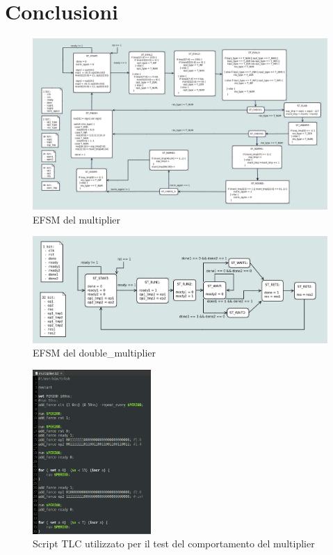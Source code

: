 \documentclass[]{IEEEtran}
\begin{document}
\section{Conclusioni}




\appendix

\begin{figure}[bt]
    \centering
    \includegraphics[width=\textwidth]{figures/EFSM-multiplier}
    \caption{EFSM del multiplier}
    \label{fig:EFSM_multiplier}
\end{figure}

\begin{figure}[bt]
    \centering
    \includegraphics[width=\textwidth]{figures/EFSM-top_level}
    \caption{EFSM del double\_multiplier}
    \label{fig:EFSM_double_multiplier}
\end{figure}


\begin{figure}[bt]
    \centering
    \includegraphics[width=0.4\textwidth]{figures/sim_mult_script}
    \caption{Script TLC utilizzato per il test del comportamento del multiplier}
    \label{fig:SCRIPT}
\end{figure}
\end{document}
